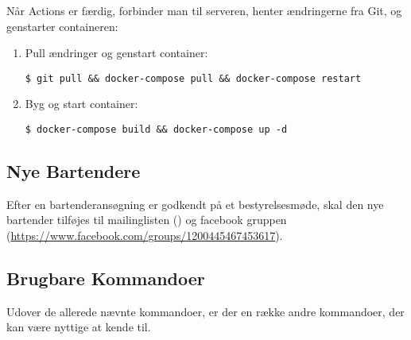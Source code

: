 Når Actions er færdig, forbinder man til serveren, henter ændringerne fra Git, og genstarter containeren:

\begin{enumerate}
    \item Pull ændringer og genstart container:
    \begin{verbatim}
$ git pull && docker-compose pull && docker-compose restart\end{verbatim}
    \item Byg og start container:
    \begin{verbatim}
$ docker-compose build && docker-compose up -d\end{verbatim}
\end{enumerate}

\subsection{Nye Bartendere}
\label{sec:nye-bartendere}

Efter en bartenderansøgning er godkendt på et bestyrelsesmøde, skal den nye bartender tilføjes til
mailinglisten () og facebook gruppen 
(\url{https://www.facebook.com/groups/1200445467453617}).

\subsection{Brugbare Kommandoer}
\label{sec:brugbare-kommandoer}

Udover de allerede nævnte kommandoer, er der en række andre kommandoer, der kan være nyttige at kende til.

